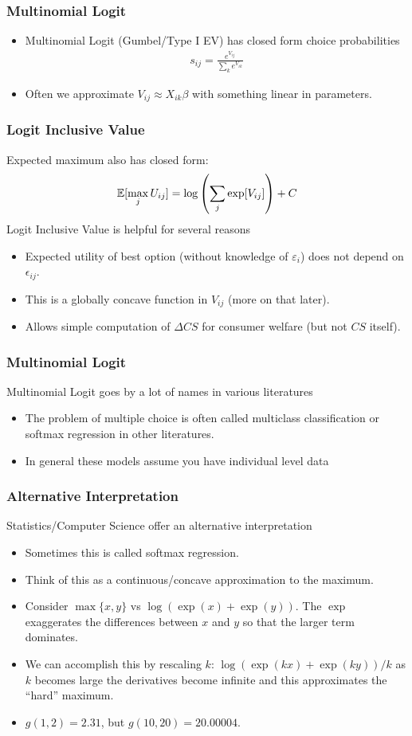 \begin{frame}
\frametitle{Multinomial Logit}
\begin{itemize}
\item Multinomial Logit (Gumbel/Type I EV) has closed form choice probabilities
\begin{eqnarray*}
s_{ij} = \frac{e^{V_{ij}}}{\sum_k e^{V_{ik}}}
\end{eqnarray*}
\item Often we approximate $V_{ij} \approx  X_{ik} \beta$ with something linear in parameters.
\end{itemize}
\end{frame}


\begin{frame}
\frametitle{Logit Inclusive Value}
 Expected maximum also has closed form:
\begin{eqnarray*}
\mathbb{E}[\max_j U_{ij}] = \log \left(\sum_j \exp[V_{ij}] \right) + C
\end{eqnarray*}
Logit Inclusive Value is helpful for several reasons
\begin{itemize}
\item Expected utility of best option (without knowledge of $\varepsilon_i$) does not depend on $\epsilon_{ij}$.
\item This is a globally concave function in $V_{ij}$ (more on that later).
\item Allows simple computation of $\Delta CS$ for consumer welfare (but not $CS$ itself).
\end{itemize}
\end{frame}

\begin{frame}
\frametitle{Multinomial Logit}
Multinomial Logit goes by a lot of names in various literatures
\begin{itemize}
\item The problem of multiple choice is often called \alert{multiclass classification} or \alert{softmax regression} in other literatures.
\item In general these models assume you have individual level data
\end{itemize}
\end{frame}

\begin{frame}
\frametitle{Alternative Interpretation}
Statistics/Computer Science offer an alternative interpretation
\begin{itemize}
\item Sometimes this is called \alert{softmax} regression.
\item Think of this as a continuous/concave approximation to the maximum.
\item Consider $\max\{x,y\}$ vs $\log(\exp(x) + \exp(y))$. The $\exp$ exaggerates the differences between $x$ and $y$ so that the larger term dominates.
\item We can accomplish this by rescaling $k$:  $\log(\exp(kx) + \exp(ky))/k$ as $k$ becomes large the derivatives become infinite and this approximates the ``hard'' maximum.
\item $g(1, 2) = 2.31$, but $g(10, 20) = 20.00004$.
\end{itemize}
\end{frame}

